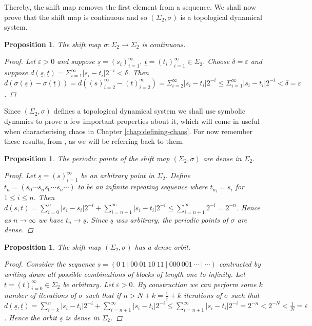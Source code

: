 \documentclass[11pt,a4paper,oneside]{memoir}
\theoremstyle{plain}
\newtheorem{prop}[thm]{Proposition}
\theoremstyle{definition}
\begin{document}
Thereby, the shift map removes the first element from a sequence. We shall now prove that the shift map is continuous and so $(\Sigma_2, \sigma)$ is a topological dynamical system.

\begin{prop}
    The shift map $\sigma: \Sigma_2 \to \Sigma_2$ is continuous.
    \begin{proof}
        Let $\varepsilon > 0$ and suppose $\underline{s} = (s_i)_{i=1}^{\infty}, \ \underline{t} = (t_i)_{i=1}^{\infty} \in \Sigma_2$. Choose $\delta = \varepsilon$ and suppose $d(\underline{s}, \underline{t}) = \Sigma_{i=1}^{\infty}|s_i - t_i|2^{-i} < \delta$. Then $d\left( \sigma\left(\underline{s}\right) - \sigma\left(\underline{t}\right) \right) = d\left((s)_{i=2}^{\infty} - (t)_{i=2}^{\infty}\right) = \Sigma_{i=2}^{\infty}|s_i - t_i|2^{-i} \leq \Sigma_{i=1}^{\infty}|s_i - t_i|2^{-i} < \delta = \varepsilon$.
    \end{proof}
\end{prop}

Since $(\Sigma_2, \sigma)$ defines a topological dynamical system we shall use symbolic dynamics to prove a few important properties about it, which will come in useful when characterising chaos in Chapter \ref{chap:defining-chaos}. For now remember these results, from \cite[Section 1.6]{devaney}, as we will be referring back to them.

\begin{prop} \label{prop:shift-map-periodic-points-dense}
    The periodic points of the shift map $(\Sigma_2, \sigma)$ are dense in $\Sigma_2$.
    \begin{proof}
        Let $\underline{s} = (s)_{i=1}^{\infty}$ be an arbitrary point in $\Sigma_2$. Define $t_n = (s_0\cdots s_ns_0\cdots s_n\cdots)$ to be an infinite repeating sequence where $t_{n_i} = s_i$ for $1 \leq i \leq n$. Then $d(s, t) = \sum_{i = 0}^n|s_i - s_i|2^{-i} + \sum_{i=n+1}^{\infty}|s_i - t_i|2^{-i} \leq \sum_{i = n+1}^{\infty}2^{-i} = 2^{-n}$. Hence as $n \to \infty$ we have $t_n \to \underline{s}$. Since $\underline{s}$ was arbitrary, the periodic points of $\sigma$ are dense.
    \end{proof}
\end{prop}

\begin{prop} \label{prop:shift-map-dense-orbit}
    The shift map $(\Sigma_2, \sigma)$ has a dense orbit.
    \begin{proof}
        Consider the sequence $\underline{s} = (0\ 1\ |\ 00\ 01\ 10\ 11\ |\ 000\ 001\ \cdots\ |\ \cdots)$ contructed by writing down all possible combinations of blocks of length one to infinity. Let $\underline{t} = (t)_{i=0}^{\infty} \in \Sigma_2$ be arbitrary. Let $\varepsilon > 0$. By construction we can perform some $k$ number of iterations of $\sigma$ such that if $n > N + k = \frac{1}{\varepsilon} + k$ iterations of $\sigma$ such that $d(\underline{s}, \underline{t}) = \sum_{i = k}^{n}|s_i - t_i|2^{-i} + \sum_{i = n+1}^{\infty}|s_i - t_i|2^{-i} \leq \sum_{i = n+1}^{\infty}|s_i - t_i|2^{-i} = 2^{-n} < 2^{-N} < \frac{1}{N} = \varepsilon$. Hence the orbit $\underline{s}$ is dense in $\Sigma_2$.
    \end{proof}
\end{prop}
\end{document}
